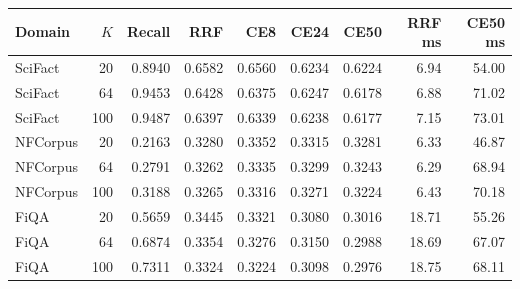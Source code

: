 \begin{tabular}{lrrrrrrrr}
\toprule
Domain & $K$ & Recall & RRF & CE8 & CE24 & CE50 & RRF ms & CE50 ms \\
\midrule
SciFact & 20 & 0.8940 & 0.6582 & 0.6560 & 0.6234 & 0.6224 & 6.94 & 54.00 \\
SciFact & 64 & 0.9453 & 0.6428 & 0.6375 & 0.6247 & 0.6178 & 6.88 & 71.02 \\
SciFact & 100 & 0.9487 & 0.6397 & 0.6339 & 0.6238 & 0.6177 & 7.15 & 73.01 \\
NFCorpus & 20 & 0.2163 & 0.3280 & 0.3352 & 0.3315 & 0.3281 & 6.33 & 46.87 \\
NFCorpus & 64 & 0.2791 & 0.3262 & 0.3335 & 0.3299 & 0.3243 & 6.29 & 68.94 \\
NFCorpus & 100 & 0.3188 & 0.3265 & 0.3316 & 0.3271 & 0.3224 & 6.43 & 70.18 \\
FiQA & 20 & 0.5659 & 0.3445 & 0.3321 & 0.3080 & 0.3016 & 18.71 & 55.26 \\
FiQA & 64 & 0.6874 & 0.3354 & 0.3276 & 0.3150 & 0.2988 & 18.69 & 67.07 \\
FiQA & 100 & 0.7311 & 0.3324 & 0.3224 & 0.3098 & 0.2976 & 18.75 & 68.11 \\
\bottomrule
\end{tabular}
